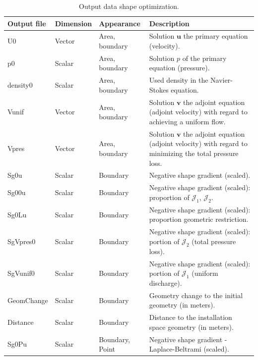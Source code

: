 \documentclass[oneside]{article}
\numberwithin{equation}{section}
\numberwithin{figure}{section}
\newcommand{\buu}{\boldsymbol{u}}
\newcommand{\JJ }{ \mathcal{J}}
\newcommand{\bvv}{\boldsymbol{v}}
\numberwithin{figure}{section}
\begin{document}
\begin{table}[h]
    \centering
    \begin{tabular}{|p{1.8cm}|p{1.4cm}|p{1.9cm}|p{6cm}|} %
        \hline
        \cellcolor{light-gray} Output file & \cellcolor{light-gray} Dimension & \centering \cellcolor{light-gray} Appearance &  \cellcolor{light-gray} Description \\
        \hline
        \centering U0          & \centering Vector     & \centering Area, boundary &      Solution $\buu$ the primary equation (velocity).\\
        \hline
        \centering p0          & \centering Scalar     & \centering Area, boundary &      Solution $ p$ of the primary equation (pressure).\\
        \hline
        \centering density0    & \centering Scalar     & \centering Area, boundary & Used density in the Navier-Stokes equation.\\
        \hline
        \centering Vunif       & \centering Vector     & \centering Area, boundary &      Solution $\bvv$ the adjoint equation (adjoint velocity) with regard to achieving a uniform flow.\\
        \hline
        \centering Vpres       & \centering Vector     & \centering Area, boundary &      Solution $\bvv$ the adjoint equation (adjoint velocity) with regard to minimizing the total pressure loss.\\
        \hline
        \centering Sg0u        & \centering Scalar     & \centering Boundary   &      Negative shape gradient (scaled).\\ 
        \hline
        \centering Sg00u       & \centering Scalar     & \centering Boundary   &      Negative shape gradient (scaled): proportion of $\JJ_1$, $\JJ_2$.\\ 
        \hline
        \centering Sg0Lu       & \centering Scalar     & \centering Boundary   &      Negative shape gradient (scaled): proportion geometric restriction.\\ 
        \hline
        \centering SgVpres0    & \centering Scalar     & \centering Boundary   &      Negative shape gradient (scaled): portion of $\JJ_2$ (total pressure loss).\\ 
        \hline
        \centering SgVunif0    & \centering Scalar     & \centering Boundary   &      Negative shape gradient (scaled): portion of $\JJ_1$ (uniform discharge).\\ 
        \hline
        \centering GeomChange  & \centering Scalar     & \centering Boundary   &      Geometry change to the initial geometry (in meters).\\     
        \hline
        \centering Distance    & \centering Scalar     & \centering Boundary   &      Distance to the installation space geometry (in meters).\\
        \hline
        \centering Sg0Pu       & \centering Scalar     & \centering Boundary, Point &      Negative shape gradient - Laplace-Beltrami (scaled).\\ 
        \hline
    \end{tabular}
    \caption{Output data shape optimization.}\label{tab:output1}
\end{table}
\end{document}
